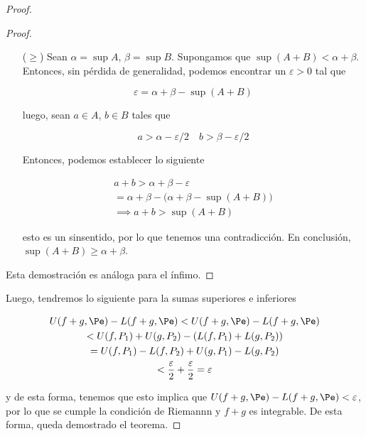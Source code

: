 \begin{proof}
{\begin{proof}
\begin{itemize}
            \begin{gather*}
                \alpha \geq a \quad \beta \geq b, \quad \forall a \in A, \forall b \in B \\
                \implies \alpha + \beta \geq a + b, \forall a + b \in A + B
            \end{gather*}
            
            \noindent pero por definición, tenemos que $\sup(A+B)$ es la menor cota superior para los elementos de $A+B$, incluyendo $\alpha + \beta$. De esta forma, $\sup(A+B) \geq \sup A + \sup B$.
            
            \item[($\geq$)] Sean $\alpha = \sup A$, $\beta = \sup B$. Supongamos que $\sup(A+B) < \alpha + \beta$. Entonces, sin pérdida de generalidad, podemos encontrar un $\varepsilon > 0$ tal que
            
            \[
            \varepsilon = \alpha + \beta - \sup(A+B)
            \]
            
            \noindent luego, sean $a \in A$, $b \in B$ tales que
            
            \[
            a > \alpha - \varepsilon/2 \quad b > \beta - \varepsilon/2
            \]
            
            Entonces, podemos establecer lo siguiente
            
            \begin{gather*}
            a + b > \alpha + \beta - \varepsilon \\
            = \alpha + \beta - \big( \alpha + \beta - \sup(A+B) \big) \\
            \implies a + b > \sup(A+B)
            \end{gather*}
            
            \noindent esto es un sinsentido, por lo que tenemos una contradicción. En conclusión, $\sup(A+B) \geq \alpha + \beta$.
        \end{itemize}
        
    Esta demostración es análoga para el ínfimo.
    \end{proof}}
    
    Luego, tendremos lo siguiente para la sumas superiores e inferiores
    
    \begin{gather*}
        U(f+g, \Pe) - L(f+g, \Pe) < U(f+g, \Pe) - L(f+g, \Pe) \\
        < U(f, P_1) + U(g, P_2) - (L(f, P_1) + L(g, P_2)) \\
        = U(f, P_1) - L(f, P_2) + U(g, P_1) - L(g, P_2) \\
        < \frac{\varepsilon}{2} + \frac{\varepsilon}{2} = \varepsilon
    \end{gather*}
    
    \noindent y de esta forma, tenemos que esto implica que $U(f+g, \Pe) - L(f+g, \Pe) < \varepsilon$, por lo que se cumple la condición de Riemannn y $f+g$ es integrable. De esta forma, queda demostrado el teorema.
\end{proof}

